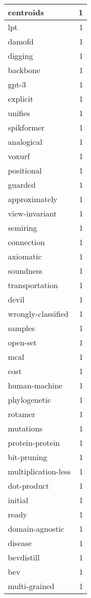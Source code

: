 \begin{table}[h]
\begin{tabular}{|l|r|}
\hline
centroids & 1 \\
\hline
lpt & 1 \\
\hline
damofd & 1 \\
\hline
digging & 1 \\
\hline
backbone & 1 \\
\hline
gpt-3 & 1 \\
\hline
explicit & 1 \\
\hline
unifies & 1 \\
\hline
spikformer & 1 \\
\hline
analogical & 1 \\
\hline
voxurf & 1 \\
\hline
positional & 1 \\
\hline
guarded & 1 \\
\hline
approximately & 1 \\
\hline
view-invariant & 1 \\
\hline
semiring & 1 \\
\hline
connection & 1 \\
\hline
axiomatic & 1 \\
\hline
soundness & 1 \\
\hline
transportation & 1 \\
\hline
devil & 1 \\
\hline
wrongly-classified & 1 \\
\hline
samples & 1 \\
\hline
open-set & 1 \\
\hline
mcal & 1 \\
\hline
cost & 1 \\
\hline
human-machine & 1 \\
\hline
phylogenetic & 1 \\
\hline
rotamer & 1 \\
\hline
mutations & 1 \\
\hline
protein-protein & 1 \\
\hline
bit-pruning & 1 \\
\hline
multiplication-less & 1 \\
\hline
dot-product & 1 \\
\hline
initial & 1 \\
\hline
ready & 1 \\
\hline
domain-agnostic & 1 \\
\hline
disease & 1 \\
\hline
bevdistill & 1 \\
\hline
bev & 1 \\
\hline
multi-grained & 1 \\

\end{tabular}
\end{table}

